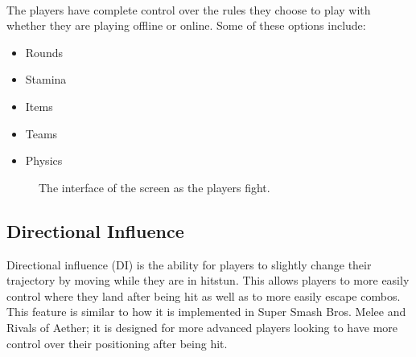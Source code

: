 \paragraph{} The players have complete control over the rules they choose to play with whether they are playing offline or online. Some of these options include:

\begin{itemize}
    \item Rounds
    \item Stamina
    \item Items
    \item Teams
    \item Physics
\end{itemize}

\begin{figure}[h!]
    \centering
    \caption{The interface of the screen as the players fight.}
\end{figure}

\subsection{Directional Influence}

Directional influence (DI) is the ability for players to slightly change their trajectory by moving while they are in hitstun. This allows players to more easily control where they land after being hit as well as to more easily escape combos. This feature is similar to how it is implemented in Super Smash Bros. Melee and Rivals of Aether; it is designed for more advanced players looking to have more control over their positioning after being hit.

